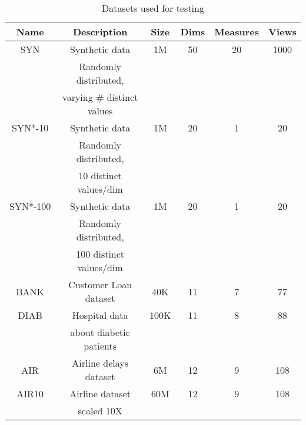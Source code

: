 \begin{table}[htb]
  \centering \scriptsize
  \begin{tabular}{|c|c|c|c|c|c|} \hline
  Name & Description & Size & Dims & Measures & Views \\ \hline
  SYN & Synthetic data & 1M & 50 & 20 & 1000 \\
  & Randomly distributed, & & & & \\ 
  & varying \# distinct values & & & & \\ \hline
  SYN*-10 & Synthetic data & 1M & 20 & 1 & 20 \\
  & Randomly distributed, & & & & \\ 
  & 10 distinct values/dim & & & & \\ \hline
  SYN*-100 & Synthetic data & 1M & 20 & 1 & 20 \\
  & Randomly distributed, & & & & \\ 
  & 100 distinct values/dim & & & & \\ \hline
  BANK  & Customer Loan dataset & 40K & 11 & 7 & 77 \\ \hline
  DIAB  & Hospital data & 100K & 11 & 8 & 88 \\
  & about diabetic patients & & & & \\ \hline
  AIR & Airline delays dataset & 6M & 12 & 9 & 108 \\ \hline
  AIR10 & Airline dataset & 60M & 12 & 9 & 108 \\ 
  & scaled 10X & & & & \\ \hline
  \end{tabular}
  \vspace{-10pt}
  \caption{Datasets used for testing}
  \label{tab:datasets} 
  \vspace{-10pt}
\end{table}













